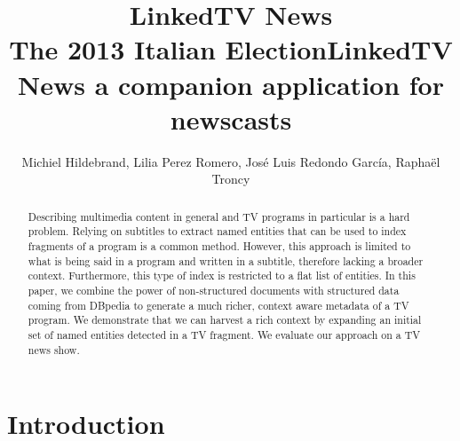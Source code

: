 \documentclass{llncs}
\begin{document}
\frontmatter          %
\pagestyle{headings}  %
\mainmatter              %
\title{LinkedTV News \\ The 2013 Italian Election}

\title{LinkedTV News a companion application for newscasts}
\author{Michiel Hildebrand, Lilia Perez Romero, Jos\'e Luis Redondo Garc\'ia, Rapha\"el Troncy}


\maketitle              %


\begin{abstract}
Describing multimedia content in general and TV programs in particular is a hard problem. Relying on subtitles to extract named entities that can be used to index fragments of a program is a common method. However, this approach is limited to what is being said in a program and written in a subtitle, therefore lacking a broader context. Furthermore, this type of index is restricted to a flat list of entities. In this paper, we combine the power of non-structured documents with structured data coming from DBpedia to generate a much richer, context aware metadata of a TV program. We demonstrate that we can harvest a rich context by expanding an initial set of named entities detected in a TV fragment. We evaluate our approach on a TV news show.

\end{abstract}


\section{Introduction}
\end{document}
